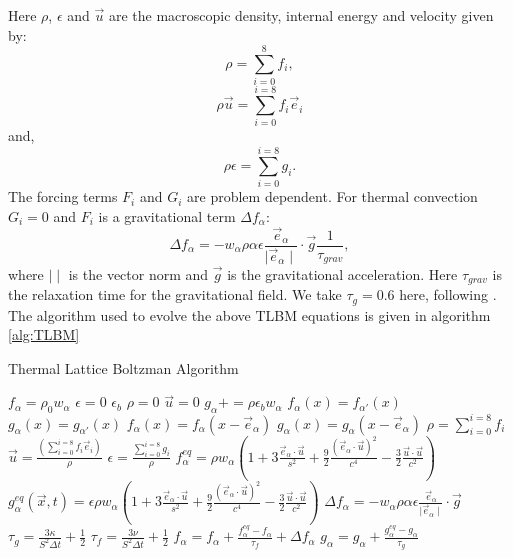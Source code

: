 \documentclass{article}
\begin{document}
Here $\rho$, $\epsilon$ and $\vec{u}$ are the macroscopic density, internal energy and velocity given by:
\begin{equation}
	\rho = \sum_{i=0}^{8} f_{i},
	\label{LBM rho}
\end{equation}
\begin{equation}
	\rho \vec{u} = \sum_{i=0}^{i=8} f_{i} \vec{e}_{i}
	\label{LBM u}
\end{equation}
and,
\begin{equation}
	\rho \epsilon = \sum_{i=0}^{i=8} g_{i}.
	\label{LBM ep}
\end{equation}
The forcing terms $F_i$ and $G_i$ are problem dependent. For thermal convection $G_i=0$ and $F_i$ is a gravitational term ${\Delta f}_{\alpha}$:
\begin{equation}
	{\Delta f}_{\alpha} = - w_{\alpha} \rho \alpha \epsilon \frac{\vec{e}_{\alpha}}{\mid \vec{e}_{\alpha} \mid} \cdot \vec{g} \frac{1}{\tau_{grav}},
\end{equation}
where $\mid \mid$ is the vector norm and $\vec{g}$ is the gravitational acceleration. Here $\tau_{grav}$ is the relaxation time for the gravitational field. We take $\tau_g=0.6$ here, following \cite{mora2017simulation}. The algorithm used to evolve the above TLBM equations is given in algorithm \ref{alg:TLBM}

\begin{algorithm}[h!]
\caption{Thermal Lattice Boltzman Algorithm}\label{alg:TLBM}
\begin{algorithmic}

\State $f_{\alpha} = \rho_0 w_{\alpha}$
\State $\epsilon = 0$
\State $\epsilon_b$
\State $\rho = 0$
\State $\vec{u} = 0$
	\State $g_{\alpha} += \rho \epsilon_b w_{\alpha} $
		\State $f_{\alpha}(x) = f_{\alpha'}(x)$
		\State $g_{\alpha}(x) = g_{\alpha'}(x)$
	\Else
		\State $f_{\alpha}(x) = f_{\alpha}(x - \vec{e}_{\alpha})$
		\State $g_{\alpha}(x) = g_{\alpha}(x - \vec{e}_{\alpha})$
	\EndIf
	\State $\rho = \sum_{i=0}^{i=8} f_{i}$
	\State $\vec{u} =\frac{(\sum_{i=0}^{i=8} f_{i} \vec{e}_{i})}{\rho} $
	\State $\epsilon = \frac{\sum_{i=0}^{i=8} g_{i}}{\rho}$
	\State $f^{eq}_{\alpha} = \rho w_{\alpha} (1 + 3 \frac{\vec{e}_{\alpha} \cdot \vec{u}}{s^2} + \frac{9}{2} \frac{(\vec{e}_{\alpha} \cdot \vec{u}  )^2}{c^4} - \frac{3}{2} \frac{\vec{u} \cdot \vec{u}}{c^2})  $
	\State $g^{eq}_{\alpha}(\vec{x}, t)  = \epsilon \rho w_{\alpha} (1 + 3 \frac{\vec{e}_{\alpha} \cdot \vec{u}}{s^2} + \frac{9}{2} \frac{(\vec{e}_{\alpha} \cdot \vec{u}  )^2}{c^4} - \frac{3}{2} \frac{\vec{u} \cdot \vec{u}}{c^2}  ) $ 
	\State ${\Delta f}_{\alpha} = - w_{\alpha} \rho \alpha \epsilon \frac{\vec{e}_{\alpha}}{\mid \vec{e}_{\alpha} \mid} \cdot \vec{g}$
	\State $\tau_g = \frac{3 \kappa}{S^2 \Delta t} + \frac{1}{2}$
	\State $\tau_f = \frac{3 \nu}{S^2 \Delta t} + \frac{1}{2}$
	\State $f_{\alpha} = f_{\alpha} + \frac{f^{eq}_{\alpha}-f_{\alpha}}{\tau_f} + {\Delta f}_{\alpha}$
	\State $g_{\alpha} = g_{\alpha} + \frac{g^{eq}_{\alpha}-g_{\alpha}}{\tau_g}$
\EndWhile
\end{algorithmic}
\end{algorithm}
\end{document}
